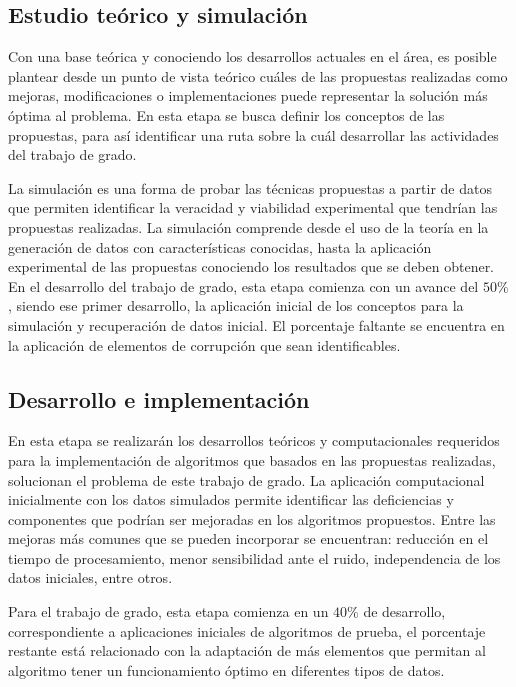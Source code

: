 \subsection{Estudio teórico y simulación}

Con una base teórica y conociendo los desarrollos actuales en el área, es posible plantear desde un punto de vista teórico cuáles de las propuestas realizadas como mejoras, modificaciones o implementaciones puede representar la solución más óptima al problema. En esta etapa se busca definir los conceptos de las propuestas, para así identificar una ruta sobre la cuál desarrollar las actividades del trabajo de grado. 

La simulación es una forma de probar las técnicas propuestas a partir de datos que permiten identificar la veracidad y viabilidad experimental que tendrían las propuestas realizadas. La simulación comprende desde el uso de la teoría en la generación de datos con características conocidas, hasta la aplicación experimental de las propuestas conociendo los resultados que se deben obtener. En el desarrollo del trabajo de grado, esta etapa comienza con un avance del $50\%$, siendo ese primer desarrollo, la aplicación inicial de los conceptos para la simulación y recuperación de datos inicial. El porcentaje faltante se encuentra en la aplicación de elementos de corrupción que sean identificables.

\subsection{Desarrollo e implementación}

En esta etapa se realizarán los desarrollos teóricos y computacionales requeridos para la implementación de algoritmos que basados en las propuestas realizadas, solucionan el problema de este trabajo de grado. La aplicación computacional inicialmente con los datos simulados permite identificar las deficiencias y componentes que podrían ser mejoradas en los algoritmos propuestos. Entre las mejoras más comunes que se pueden incorporar se encuentran: reducción en el tiempo de procesamiento, menor sensibilidad ante el ruido, independencia de los datos iniciales, entre otros.

Para el trabajo de grado, esta etapa comienza en un $40\%$ de desarrollo, correspondiente a aplicaciones iniciales de algoritmos de prueba, el porcentaje restante está relacionado con la adaptación de más elementos que permitan al algoritmo tener un funcionamiento óptimo en diferentes tipos de datos.


